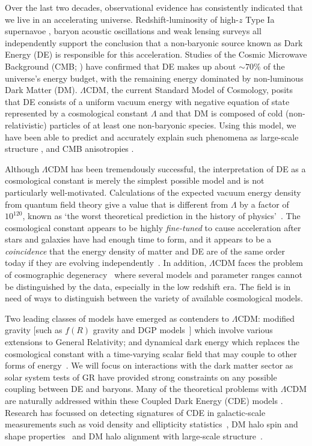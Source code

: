 \documentclass[a4paper,fleqn,usenatbib]{mnras}
\begin{document}
Over the last two decades, observational evidence has consistently indicated that we live in an accelerating universe. Redshift-luminosity of high-$z$ Type Ia supernavoe \citep{1999ApJ...517..565P, 1998AJ....116.1009R}, baryon acoustic oscillations \citep{2011MNRAS.418.1707B} and weak lensing surveys \citep{2007MNRAS.381..702B} all independently support the conclusion that a non-baryonic source known as Dark Energy (DE) is responsible for this acceleration. Studies of the Cosmic Microwave Background (CMB; \citet{2016A&A...594A..13P}) have confirmed that DE makes up about $\sim70\%$ of the universe's energy budget, with the remaining energy dominated by non-luminous Dark Matter (DM). $\Lambda$CDM, the current Standard Model of Cosmology, posits that DE consists of a uniform vacuum energy with negative equation of state represented by a cosmological constant $\Lambda$ and that DM is composed of cold (non-relativistic) particles of at least one non-baryonic species. Using this model, we have been able to predict and accurately explain such phenomena as large-scale structure \citep{2015ApJS..219...12A}, and CMB anisotropies \citep{1999Sci...284.1481B}.
 
Although $\Lambda$CDM has been tremendously successful, the interpretation of DE as a cosmological constant is merely the simplest possible model and is not particularly well-motivated. Calculations of the expected vacuum energy density from quantum field theory give a value that is different from $\Lambda$ by a factor of $10^{120}$, known as `the worst theoretical prediction in the history of physics'~\citep{2006Hobson}. The cosmological constant appears to be highly \textit{fine-tuned} to cause acceleration after stars and galaxies have had enough time to form, and it appears to be a \textit{coincidence} that the energy density of matter and DE are of the same order today if they are evolving independently~\citep{1989RvMP...61....1W}. In addition, $\Lambda$CDM faces the problem of cosmographic degeneracy~\citep{2014NuPhS.246..171S} where several models and parameter ranges cannot be distinguished by the data, especially in the low redshift era. The field is in need of ways to distinguish between the variety of available cosmological models.

Two leading classes of models have emerged as contenders to $\Lambda$CDM: modified gravity [such as $f(R)$ gravity and DGP models~\citep{2012PhR...513....1C}] which involve various extensions to General Relativity; and dynamical dark energy which replaces the cosmological constant with a time-varying scalar field that may couple to other forms of energy~\citep{2015PhR...568....1J}. We will focus on interactions with the dark matter sector as solar system tests of GR have provided strong constraints on any possible coupling between DE and baryons. Many of the theoretical problems with $\Lambda$CDM are naturally addressed within these Coupled Dark Energy (CDE) models \citep{2004ApJ...605...21C}. Research has focussed on detecting signatures of CDE in galactic-scale measurements such as void density and ellipticity statistics~\citep{2017MNRAS.468.3381A}, DM halo spin and shape properties~\citep{2015MNRAS.452.1341E} and DM halo alignment with large-scale structure~\citep{2017MNRAS.468.3174L}.
\end{document}

